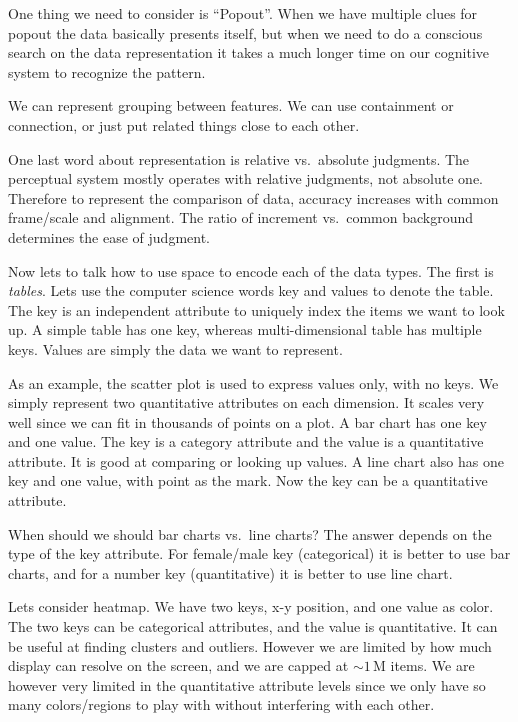 \documentclass[letterpaper, 11pt]{article}
\numberwithin{equation}{section}
\numberwithin{figure}{section}
\begin{document}
One thing we need to consider is ``Popout''. When we have multiple clues for
popout the data basically presents itself, but when we need to do a conscious
search on the data representation it takes a much longer time on our cognitive
system to recognize the pattern.

We can represent grouping between features. We can use containment or
connection, or just put related things close to each other.

One last word about representation is relative vs.\ absolute judgments.
The perceptual system mostly operates with relative judgments, not absolute one.
Therefore to represent the comparison of data, accuracy increases with common
frame/scale and alignment. The ratio of increment vs.\ common background
determines the ease of judgment.

Now lets to talk how to use space to encode each of the data types. The first is
\emph{tables}. Lets use the computer science words key and values to denote the
table. The key is an independent attribute to uniquely index the items we want
to look up. A simple table has one key, whereas multi-dimensional table has
multiple keys. Values are simply the data we want to represent.

As an example, the scatter plot is used to express values only, with no keys. We
simply represent two quantitative attributes on each dimension. It scales very
well since we can fit in thousands of points on a plot. A bar chart has one key
and one value. The key is a category attribute and the value is a quantitative
attribute. It is good at comparing or looking up values. A line chart also has
one key and one value, with point as the mark. Now the key can be a quantitative
attribute.

When should we should bar charts vs.\ line charts? The answer depends on the
type of the key attribute. For female/male key (categorical) it is better to use
bar charts, and for a number key (quantitative) it is better to use line chart.

Lets consider heatmap. We have two keys, x-y position, and one value as color.
The two keys can be categorical attributes, and the value is quantitative. It
can be useful at finding clusters and outliers. However we are limited by how
much display can resolve on the screen, and we are capped at $\sim
1\,\mathrm{M}$ items. We are however very limited in the quantitative attribute
levels since we only have so many colors/regions to play with without
interfering with each other.
\end{document}
